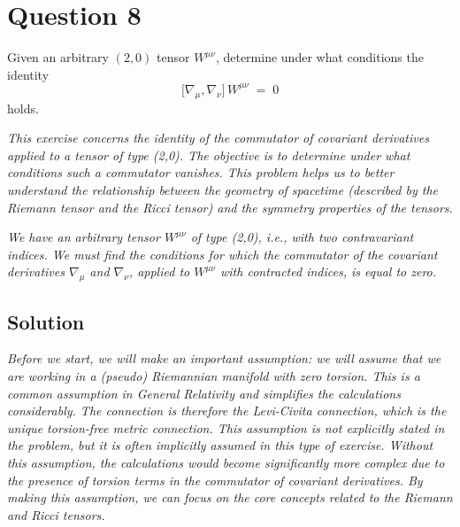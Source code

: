 \documentclass{article}
\begin{document}
\section*{Question 8}

Given an arbitrary $(2,0)$ tensor $W^{\mu\nu}$, determine under what conditions the identity
\[
\bigl[\nabla_{\mu}, \nabla_{\nu}\bigr] \,W^{\mu\nu} \;=\; 0
\]
holds.

\textit{This exercise concerns the identity of the commutator of covariant derivatives applied to a tensor of type (2,0). The objective is to determine under what conditions such a commutator vanishes. This problem helps us to better understand the relationship between the geometry of spacetime (described by the Riemann tensor and the Ricci tensor) and the symmetry properties of the tensors.}

\textit{We have an arbitrary tensor \(W^{\mu\nu}\) of type (2,0), i.e., with two contravariant indices. We must find the conditions for which the commutator of the covariant derivatives \(\nabla_{\mu}\) and \(\nabla_{\nu}\), applied to \(W^{\mu\nu}\) with contracted indices, is equal to zero. }

\subsection*{Solution}

\textit{Before we start, we will make an important assumption: we will assume that we are working in a (pseudo) Riemannian manifold with zero torsion. This is a common assumption in General Relativity and simplifies the calculations considerably. The connection is therefore the Levi-Civita connection, which is the unique torsion-free metric connection.  This assumption is not explicitly stated in the problem, but it is often implicitly assumed in this type of exercise. Without this assumption, the calculations would become significantly more complex due to the presence of torsion terms in the commutator of covariant derivatives.  By making this assumption, we can focus on the core concepts related to the Riemann and Ricci tensors.}
\end{document}
